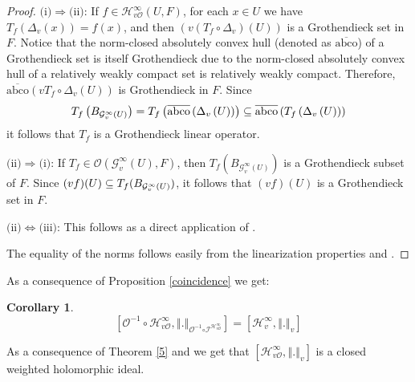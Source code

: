 \documentclass[12pt]{amsart}
\theoremstyle{plain}
\newtheorem{corollary}[theorem]{Corollary}
\numberwithin{equation}{section}
\begin{document}
\begin{proof}
$($i$)\Rightarrow ($ii$)$: If $f\in \mathcal{H}_{v\mathcal{O}}^{\infty
}(U,F) $, for each $x\in U$ we have $T_{f}\left( \Delta _{v}\left( x\right) \right) =f\left(
x\right)$, and then $(v(T_f\circ \Delta_v)(U))$ is a Grothendieck set in $F$. Notice that the norm-closed absolutely
convex hull (denoted as $\overline{\text{abco}}$) of a Grothendieck set is itself Grothendieck due to the
norm-closed absolutely convex hull of a relatively weakly compact set is
relatively weakly compact. Therefore, $\overline{\text{abco}}\left(v
T_{f}\circ\Delta _{v}\left( U \right) \right) $ is Grothendieck in $%
F$. Since 
\begin{equation*}
T_{f}\left( B_{\mathcal{G}_{v}^{\infty }(U)}\right) =T_{f}\left( \overline{%
\text{abco}}\left( \Delta _{v}\left( U\right) \right) \right) \subseteq 
\overline{\text{abco}}\left( T_{f}\left( \Delta _{v}\left( U\right) \right)
\right)
\end{equation*}
it follows that $T_{f}$ is a Grothendieck linear operator.

$($ii$)\Rightarrow ($i$)$: If $T_{f}\in \mathcal{O}(\mathcal{G}_{v}^{\infty
}(U),F)$, then $T_{f}\left( B_{\mathcal{G}_{v}^{\infty }(U)}\right) $ is a
Grothendieck subset of $F$. Since $(vf)(U)\subseteq T_f(B_{%
\mathcal{G}_{v}^{\infty }(U)})$, it follows that $(vf)\left( U\right)
 $ is a Grothendieck set in $F$.

$($ii$)\Leftrightarrow ($iii$)$: This follows as a direct application of 
\cite[Theorem 2.7]{CaJiKe}.

The equality of the norms follows easily from the linearization properties and \cite[Theorem 2.7]%
{CaJiKe}.
\end{proof}

As a consequence of Proposition \ref{coincidence} we get:
\begin{corollary}
\begin{equation*}
\left[ \mathcal{O}^{-1}\circ \mathcal{H}_{v\mathcal O}^{\infty
},\left\Vert .\right\Vert _{\mathcal{O}^{-1}\mathcal{\circ I}^{\mathcal{H}%
_{v\mathcal O}^{\infty }}}\right] =\left[ \mathcal{H}_{v}^{\infty },\left\Vert
.\right\Vert _{v}\right]
\end{equation*}%
\end{corollary}

As a consequence of Theorem \ref{5} and \cite[Corollary 2.5]{CaJiRu} we get that $\left[ \mathcal{H}_{v\mathcal{O}}^{\infty },\left\Vert
.\right\Vert _{v}\right] $ is a closed weighted holomorphic ideal.
\end{document}
